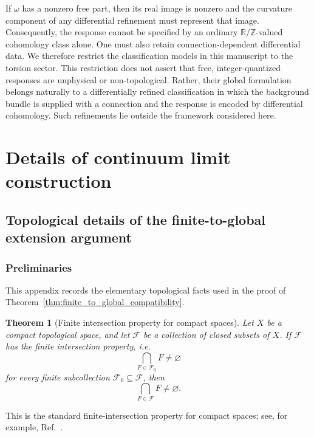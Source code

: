 \documentclass[aps,prx,reprint,superscriptaddress,twocolumn,amsmath,amssymb,amsfonts, nofootinbib]{revtex4-2}
\theoremstyle{apsstyle}
\newtheorem{theorem}{Theorem}[section]
\begin{document}
If $\omega$ has a nonzero free part, then its real image is nonzero and the curvature component of any differential refinement must represent that image. Consequently, the response cannot be specified by an ordinary $\mathbb R/\mathbb Z$-valued cohomology class alone. One must also retain connection-dependent differential data. We therefore restrict the classification models in this manuscript to the torsion sector. This restriction does not assert that free, integer-quantized responses are unphysical or non-topological. Rather, their global formulation belongs naturally to a differentially refined classification in which the background bundle is supplied with a connection and the response is encoded by differential cohomology. Such refinements lie outside the framework considered here.


\section{Details of continuum limit construction}
\label{app:groundup_continuumlimit}
\subsection{Topological details of the finite-to-global extension argument}
\label{app:gl2}

\subsubsection{Preliminaries}

This appendix records the elementary topological facts used in the proof of
Theorem~\ref{thm:finite_to_global_compatibility}.

\begin{theorem}[Finite intersection property for compact spaces] \label{thm:finite_intersection} Let $X$ be a compact topological space, and let $\mathcal F$ be a collection of closed subsets of $X$. If $\mathcal F$ has the finite intersection property, i.e. \begin{equation} \bigcap_{F\in\mathcal F_0}F\neq\varnothing \label{eq:fip} \end{equation} for every finite subcollection $\mathcal F_0\subseteq\mathcal F$, then \begin{equation*} \bigcap_{F\in\mathcal F}F\neq\varnothing. \end{equation*} 
\end{theorem} 
\noindent This is the standard finite-intersection property for compact spaces; see, for example, Ref.~\cite[\href{https://stacks.math.columbia.edu/tag/005D}{Tag 005D}]{stacks-project}.
\end{document}
